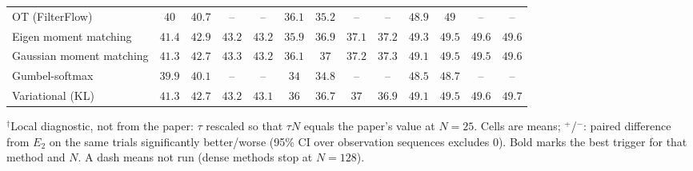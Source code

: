 \begin{table}[ht]
\begin{adjustbox}{max width=\linewidth}
\begin{tabular}{lcccc|cccc|cccc}
OT (FilterFlow) & $40$ & $40.7$ & -- & -- & $36.1$ & $35.2$ & -- & -- & $48.9$ & $49$ & -- & -- \\
Eigen moment matching & $41.4$ & $42.9$ & $43.2$ & $43.2$ & $35.9$ & $36.9$ & $37.1$ & $37.2$ & $49.3$ & $49.5$ & $49.6$ & $49.6$ \\
Gaussian moment matching & $41.3$ & $42.7$ & $43.3$ & $43.2$ & $36.1$ & $37$ & $37.2$ & $37.3$ & $49.1$ & $49.5$ & $49.5$ & $49.6$ \\
Gumbel-softmax & $39.9$ & $40.1$ & -- & -- & $34$ & $34.8$ & -- & -- & $48.5$ & $48.7$ & -- & -- \\
Variational (KL) & $41.3$ & $42.7$ & $43.2$ & $43.1$ & $36$ & $36.7$ & $37$ & $36.9$ & $49.1$ & $49.5$ & $49.6$ & $49.7$ \\
\bottomrule
\end{tabular}
\end{adjustbox}
\par\smallskip\parbox{0.95\linewidth}{\footnotesize $^\dagger$Local diagnostic, not from the paper: $\tau$ rescaled so that $\tau N$ equals the paper's value at $N{=}25$. Cells are means; $^{+}$/$^{-}$: paired difference from $E_2$ on the same trials significantly better/worse (95\% CI over observation sequences excludes 0). Bold marks the best trigger for that method and $N$. A dash means not run (dense methods stop at $N{=}128$).}
\end{table}

